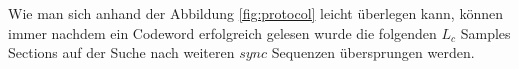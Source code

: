 Wie man sich anhand der Abbildung \ref{fig:protocol} leicht überlegen kann, können immer nachdem ein Codeword erfolgreich gelesen wurde die folgenden $L_c$ Samples Sections  auf der Suche nach weiteren $sync$ Sequenzen übersprungen werden.




